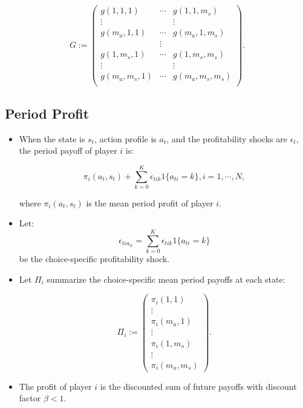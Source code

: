 \documentclass[]{book}
\begin{document}
\begin{equation}
G := 
\begin{pmatrix}
g(1, 1, 1) & \cdots & g(1, 1, m_s)\\
\vdots & & \vdots \\
g(m_a, 1, 1) & \cdots & g(m_a, 1, m_s)\\
&\vdots& \\
g(1, m_s, 1) & \cdots & g(1, m_s, m_s)\\
\vdots & & \vdots \\
g(m_a, m_s, 1) & \cdots & g(m_a, m_s, m_s)\\
\end{pmatrix}.
\end{equation}

\subsection{Period Profit}\label{period-profit}

\begin{itemize}
\item
  When the state is \(s_t\), action profile is \(a_t\), and the
  profitability shocks are \(\epsilon_t\), the period payoff of player
  \(i\) is:

  \begin{equation}
  \pi_i(a_t, s_t) + \sum_{k = 0}^K \epsilon_{tik}1\{a_{ti} = k\}, i = 1, \cdots, N,
  \end{equation}

  where \(\pi_i(a_t, s_t)\) is the mean period profit of player \(i\).
\item
  Let: \[
  \epsilon_{ti a_{ti}} = \sum_{k = 0}^K \epsilon_{tik}1\{a_{ti} = k\}
  \] be the choice-specific profitability shock.
\item
  Let \(\Pi_i\) summarize the choice-specific mean period payoffs at
  each state:

  \begin{equation}
  \Pi_i :=
  \begin{pmatrix}
  \pi_i(1, 1)\\
  \vdots\\
  \pi_i(m_a, 1)\\
  \vdots\\
  \pi_i(1, m_s)\\
  \vdots\\
  \pi_i(m_a, m_s)
  \end{pmatrix}.
  \end{equation}
\item
  The profit of player \(i\) is the discounted sum of future payoffs
  with discount factor \(\beta < 1\).
\end{itemize}
\end{document}
